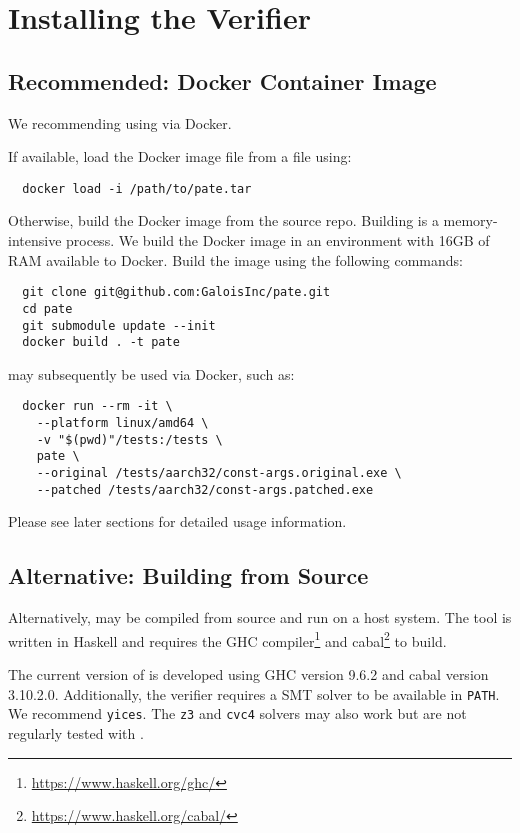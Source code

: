 \section{Installing the \pate{} Verifier}
\label{sec:build-pate-verif}

\subsection{Recommended: Docker Container Image}

We recommending using \pate{} via Docker.

If available, load the Docker image file from a file using:
\begin{verbatim}
  docker load -i /path/to/pate.tar
\end{verbatim}

Otherwise, build the Docker image from the \pate{} source repo.
Building \pate{} is a memory-intensive process.
We build the Docker image in an environment with 16GB of RAM available to Docker.
Build the image using the following commands:

\begin{verbatim}
  git clone git@github.com:GaloisInc/pate.git
  cd pate
  git submodule update --init
  docker build . -t pate
\end{verbatim}

\pate{} may subsequently be used via Docker, such as:

\begin{verbatim}
  docker run --rm -it \
    --platform linux/amd64 \
    -v "$(pwd)"/tests:/tests \
    pate \
    --original /tests/aarch32/const-args.original.exe \
    --patched /tests/aarch32/const-args.patched.exe
\end{verbatim}

Please see later sections for detailed usage information.

\subsection{Alternative: Building from Source}

Alternatively, \pate{} may be compiled from source and run on a host system.
The \pate{} tool is written in Haskell and requires the GHC compiler\footnote{\url{https://www.haskell.org/ghc/}} and cabal\footnote{\url{https://www.haskell.org/cabal/}} to build.

The current version of \pate{} is developed using GHC version 9.6.2 and cabal version 3.10.2.0.
Additionally, the verifier requires a SMT solver to be available in \texttt{PATH}.
We recommend \texttt{yices}.
The \texttt{z3} and \texttt{cvc4} solvers may also work but are not regularly tested with \pate{}.

